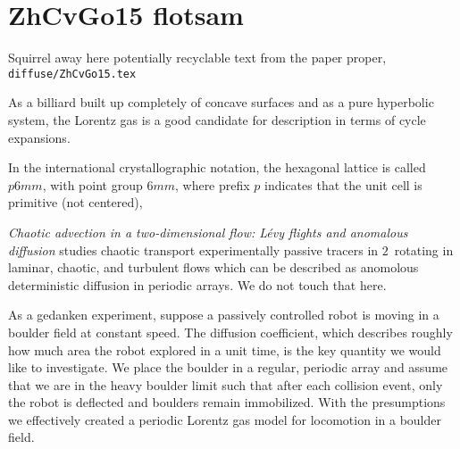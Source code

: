 
\section{ZhCvGo15 flotsam}
\label{s:flotsam}

Squirrel away here potentially recyclable text from the
paper proper, \texttt{diffuse/ZhCvGo15.tex}


%

As a billiard built up completely of concave surfaces and as a pure
hyperbolic system, the Lorentz gas is a good candidate for description in
terms of cycle expansions.


In the international crystallographic notation, the hexagonal lattice is
called $p6mm$, with point group $6mm$, where prefix $p$ indicates that
the unit cell is primitive (not centered),


                                                            \toCB
{} {\em Chaotic advection in a two-dimensional
flow: L\'evy flights and anomalous diffusion} studies chaotic transport
experimentally passive tracers in $2$\dmn\ rotating in laminar, chaotic,
and turbulent flows which can be described as anomolous deterministic
diffusion in periodic arrays. We do not touch that here.


%
%

As a gedanken experiment, suppose a passively controlled robot is moving
in a boulder field at constant speed. The diffusion coefficient, which
describes roughly how much area the robot explored in a unit time, is the
key quantity we would like to investigate. We place the boulder in a
regular, periodic array and assume that we are in the heavy boulder limit
such that after each collision event, only the robot is deflected and
boulders remain immobilized. With the presumptions we effectively created
a periodic Lorentz gas model for locomotion in a boulder
field.


